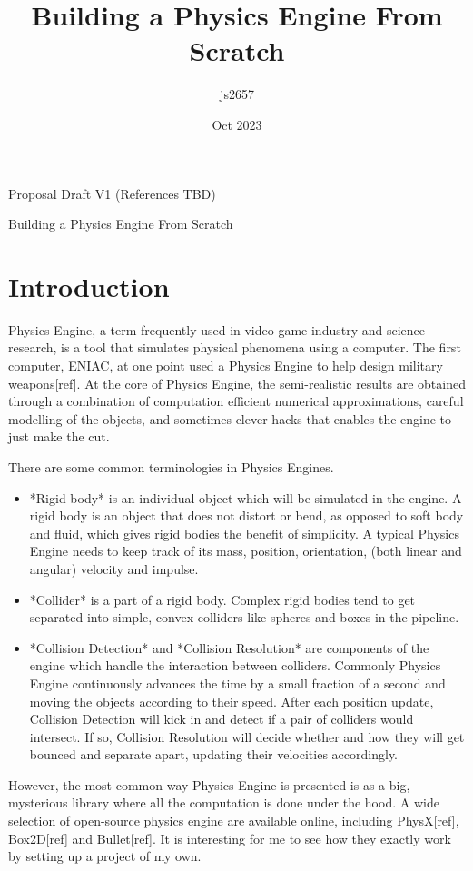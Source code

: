 \documentclass[12pt]{report}
\title{Building a Physics Engine From Scratch}
\author{js2657}
\date{Oct 2023}
\begin{document}
Proposal Draft V1 (References TBD)

Building a Physics Engine From Scratch

\section{Introduction}

Physics Engine, a term frequently used in video game industry and science research, 
is a tool that simulates physical phenomena using a computer.
The first computer, ENIAC, at one point used a Physics Engine to help design military weapons[ref].
At the core of Physics Engine, the semi-realistic results are obtained through a combination of 
computation efficient numerical approximations, 
careful modelling of the objects, 
and sometimes clever hacks that enables the engine to just make the cut.

There are some common terminologies in Physics Engines.
\begin{itemize}
\item *Rigid body* is an individual object which will be simulated in the engine.
A rigid body is an object that does not distort or bend, as opposed to soft body and fluid, 
which gives rigid bodies the benefit of simplicity.
A typical Physics Engine needs to keep track of its mass, position, orientation, (both linear and angular) velocity and impulse.
\item *Collider* is a part of a rigid body.
Complex rigid bodies tend to get separated into simple, convex colliders like spheres and boxes in the pipeline.
\item *Collision Detection* and *Collision Resolution* are components of the engine which handle the interaction between colliders.
Commonly Physics Engine continuously advances the time by a small fraction of a second and moving the objects according to their speed.
After each position update, Collision Detection will kick in and detect if a pair of colliders would intersect.
If so, Collision Resolution will decide whether and how they will get bounced and separate apart, 
updating their velocities accordingly.
\end{itemize}

However, the most common way Physics Engine is presented is as a big, mysterious library where all the computation is done under the hood.
A wide selection of open-source physics engine are available online, including PhysX[ref], Box2D[ref] and Bullet[ref].
It is interesting for me to see how they exactly work by setting up a project of my own.
\end{document}
